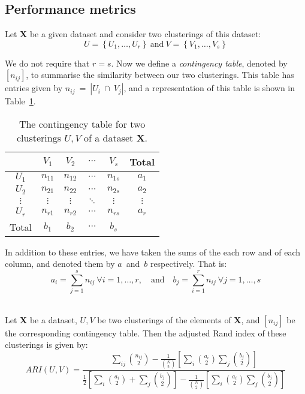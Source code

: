 \subsection{Performance metrics}\label{subsec:metrics}

\begin{definition}\label{def:contingency}
    Let \textbf{X} be a given dataset and consider two clusterings of this
    dataset:
    \[
        U = \left\{U_1, \ldots, U_r\right\}
        \ \text{and} \
        V = \left\{V_1, \ldots, V_s\right\}
    \]

    We do not require that \(r = s\). Now we define a \emph{contingency table},
    denoted by \(\left[n_{ij}\right]\), to summarise the similarity between our
    two clusterings. This table has entries given by
    \(n_{ij}~=~|U_i~\cap~V_j|\), and a representation of this table is shown in
    Table~\ref{tab:contingency}.

    \begin{table}[H]
    \centering
    \begin{tabular}{cccccc}
        {} & \(V_1\) & \(V_2\) & \(\cdots\) & \(V_s\) & Total
        \\ \midrule
        \(U_1\) & \(n_{11}\) & \(n_{12}\) & \(\cdots\) & \(n_{1s}\) & \(a_1\)
        \\
        \(U_2\) & \(n_{21}\) & \(n_{22}\) & \(\cdots\) & \(n_{2s}\) & \(a_2\)
        \\
        \(\vdots\) & \(\vdots\) & \(\vdots\) & \(\ddots\) & \(\vdots\) &
        \(\vdots\)
        \\
        \(U_r\) & \(n_{r1}\) & \(n_{r2}\) & \(\cdots\) & \(n_{rs}\) & \(a_r\)
        \\ \midrule
        Total & \(b_1\) & \(b_2\) & \(\cdots\) & \(b_s\) & {}
    \end{tabular}
    \caption{The contingency table for two clusterings \(U, V\) of a dataset
    \textbf{X}.}\label{tab:contingency}
    \end{table}

    In addition to these entries, we have taken the sums of the each row and of
    each column, and denoted them by \(a\)~and~\(b\) respectively. That is:
    \[
        a_i = \sum_{j=1}^s n_{ij} \ \forall i = 1, \ldots, r, \quad \text{and}
        \quad b_j = \sum_{i=1}^r n_{ij} \ \forall j = 1, \ldots, s
    \]\\
\end{definition}

\begin{definition}\label{def:adjusted-rand-index}
    Let \textbf{X} be a dataset, \(U, V\) be two clusterings of the elements of
    \textbf{X}, and \(\left[n_{ij}\right]\) be the corresponding contingency
    table. Then the adjusted Rand index of these clusterings is given by:
    \[
        ARI(U, V) = \frac{\displaystyle{\sum_{ij} {n_{ij}\choose 2} -
        \frac{1}{{N\choose 2}}\left[\sum_i {a_i\choose 2}\sum_j {b_j\choose
        2}\right]}}{\displaystyle{\frac{1}{2} \left[\sum_i {a_i\choose 2} +
        \sum_j{b_j\choose 2}\right] - \frac{1}{{N\choose 2}}\left[\sum_i
        {a_i\choose 2}\sum_j {b_j\choose 2}\right]}}
    \]
\end{definition}

